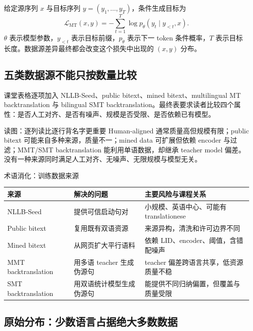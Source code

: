 给定源序列 $x$ 与目标序列 $y=(y_1,\ldots,y_T)$，条件生成目标为
\[
\mathcal{L}_{\text{MT}}(x,y)=-\sum_{t=1}^{T}\log p_\theta(y_t\mid y_{<t},x).
\]
$\theta$ 表示模型参数，$y_{<t}$ 表示目标前缀，$p_\theta$ 表示下一 token 条件概率，$T$ 表示目标长度。数据源差异最终都会改变这个损失中出现的 $(x,y)$ 分布。

\subsection{五类数据源不能只按数量比较}

课堂表格逐项加入 NLLB-Seed、public bitext、mined bitext、multilingual MT backtranslation 与 bilingual SMT backtranslation。最终表要求读者比较四个属性：是否人工对齐、是否有噪声、规模是否受限、是否依赖已有模型。


\begin{knowledgebox}{读图：逐列读比逐行背名字更重要}
Human-aligned 通常质量高但规模有限；public bitext 可能来自多种来源，质量不一；mined data 可扩展但依赖 encoder 与过滤；MMT/SMT backtranslation 能利用单语数据，却继承 teacher model 偏差。没有一种来源同时满足人工对齐、无噪声、无限规模与模型无关。
\end{knowledgebox}

\begin{knowledgebox}{术语消化：训练数据来源}
\begin{tabularx}{\textwidth}{@{}L{0.19\textwidth}L{0.25\textwidth}X@{}}
\toprule
来源 & 解决的问题 & 主要风险与课程关系 \\
\midrule
NLLB-Seed & 提供可信启动句对 & 小规模、英语中心、可能有 translationese \\
Public bitext & 复用既有双语资源 & 来源异构，清洗和许可边界不同 \\
Mined bitext & 从网页扩大平行语料 & 依赖 LID、encoder、阈值，含错配噪声 \\
MMT backtranslation & 用多语 teacher 生成伪源句 & teacher 偏差跨语言共享，低资源质量不稳 \\
SMT backtranslation & 用双语统计模型生成伪源句 & 能提供不同归纳偏置，但覆盖与质量受限 \\
\bottomrule
\end{tabularx}
\end{knowledgebox}

\subsection{原始分布：少数语言占据绝大多数数据}

